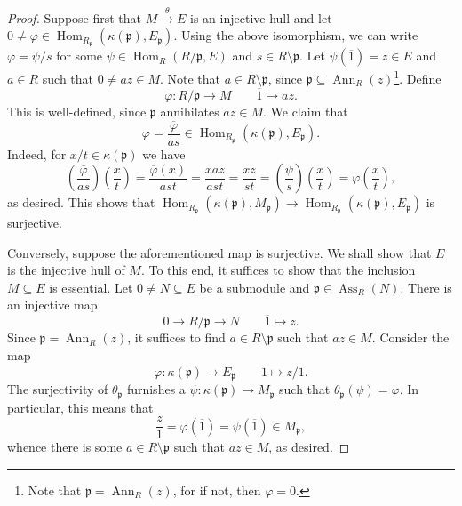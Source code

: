 \documentclass[10pt]{article}
\theoremstyle{thmstyle}
\theoremstyle{defstyle}
\newcommand{\Ann}{\operatorname{Ann}}
\newcommand{\Hom}{\operatorname{Hom}}
\newcommand{\frakp}{\mathfrak{p}} %
\newcommand{\Ass}{\operatorname{Ass}}
\begin{document}
\begin{proof}
    Suppose first that $M\xrightarrow{\theta} E$ is an injective hull and let $0\ne\varphi\in\Hom_{R_\frakp}(\kappa(\frakp), E_\frakp)$. Using the above isomorphism, we can write $\varphi = \psi/s$ for some $\psi\in\Hom_R(R/\frakp, E)$ and $s\in R\setminus\frakp$. Let $\psi(\overline 1) = z\in E$ and $a\in R$ such that $0\ne az\in M$. Note that $a\in R\setminus\frakp$, since $\frakp\subseteq\Ann_R(z)$\footnote{Note that $\frakp = \Ann_R(z)$, for if not, then $\varphi = 0$.}. Define
    \begin{equation*}
        \overline\varphi: R/\frakp\longrightarrow M\qquad \overline 1\longmapsto az.
    \end{equation*}
    This is well-defined, since $\frakp$ annihilates $az\in M$. We claim that 
    \begin{equation*}
        \varphi = \frac{\overline\varphi}{as}\in\Hom_{R_\frakp}\left(\kappa(\frakp), E_\frakp\right).
    \end{equation*}
    Indeed, for $x/t\in\kappa(\frakp)$ we have 
    \begin{equation*}
        \left(\frac{\overline\varphi}{as}\right)\left(\frac{x}{t}\right) = \frac{\overline\varphi(x)}{ast} = \frac{xaz}{ast} = \frac{xz}{st} = \left(\frac{\psi}{s}\right)\left(\frac{x}{t}\right) = \varphi\left(\frac{x}{t}\right),
    \end{equation*}
    as desired. This shows that $\Hom_{R_\frakp}(\kappa(\frakp), M_\frakp)\to\Hom_{R_\frakp}(\kappa(\frakp), E_\frakp)$ is surjective. 

    Conversely, suppose the aforementioned map is surjective. We shall show that $E$ is the injective hull of $M$. To this end, it suffices to show that the inclusion $M\subseteq E$ is essential. Let $0\ne N\subseteq E$ be a submodule and $\frakp\in\Ass_R(N)$. There is an injective map 
    \begin{equation*}
        0\to R/\frakp\longrightarrow N\qquad \overline 1\longmapsto z.
    \end{equation*}
    Since $\frakp = \Ann_R(z)$, it suffices to find $a\in R\setminus\frakp$ such that $az\in M$. Consider the map 
    \begin{equation*}
        \varphi: \kappa(\frakp)\longrightarrow E_\frakp\qquad \overline 1\longmapsto z/1.
    \end{equation*}
    The surjectivity of $\theta_\frakp$ furnishes a $\psi: \kappa(\frakp)\to M_\frakp$ such that $\theta_\frakp(\psi) = \varphi$. In particular, this means that 
    \begin{equation*}
        \frac{z}{1} = \varphi(\overline 1) = \psi(\overline 1)\in M_\frakp,
    \end{equation*}
    whence there is some $a\in R\setminus\frakp$ such that $az\in M$, as desired.
\end{proof}
\end{document}

